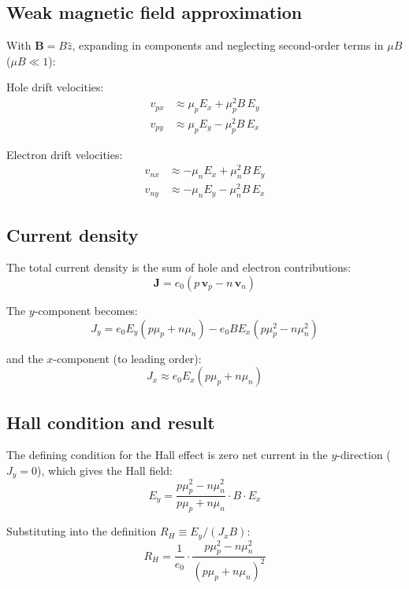 \documentclass[%
 reprint,
 amsmath,amssymb,
 aps,
]{revtex4-2}
\begin{document}
\subsection{Weak magnetic field approximation}

With $\mathbf{B} = B\hat{z}$, expanding in components and neglecting second-order terms in $\mu B$ ($\mu B \ll 1$):

Hole drift velocities:
\begin{align}
  v_{px} &\approx \mu_p E_x + \mu_p^2 B\, E_y \\
  v_{py} &\approx \mu_p E_y - \mu_p^2 B\, E_x
\end{align}

Electron drift velocities:
\begin{align}
  v_{nx} &\approx -\mu_n E_x + \mu_n^2 B\, E_y \\
  v_{ny} &\approx -\mu_n E_y - \mu_n^2 B\, E_x
\end{align}

\subsection{Current density}

The total current density is the sum of hole and electron contributions:
\begin{equation}
  \mathbf{J} = e_0(p\,\mathbf{v}_p - n\,\mathbf{v}_n)
\end{equation}

The $y$-component becomes:
\begin{equation}
  J_y = e_0 E_y(p\mu_p + n\mu_n) - e_0 B E_x(p\mu_p^2 - n\mu_n^2)
\end{equation}

and the $x$-component (to leading order):
\begin{equation}
  J_x \approx e_0 E_x(p\mu_p + n\mu_n)
\end{equation}

\subsection{Hall condition and result}

The defining condition for the Hall effect is zero net current in the $y$-direction ($J_y = 0$), which gives the Hall field:
\begin{equation}
  E_y = \frac{p\mu_p^2 - n\mu_n^2}{p\mu_p + n\mu_n} \cdot B \cdot E_x
\end{equation}

Substituting into the definition $R_H \equiv E_y / (J_x B)$:
\begin{equation}
  R_H = \frac{1}{e_0} \cdot \frac{p\mu_p^2 - n\mu_n^2}{(p\mu_p + n\mu_n)^2}
  \label{eq:hall-coeff}
\end{equation}
\end{document}
